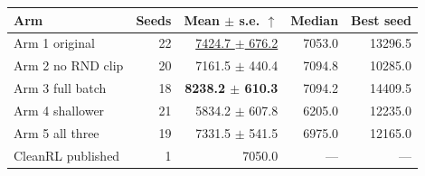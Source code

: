 \begin{tabular}{@{}lrrrr@{}}
\toprule
\textbf{Arm} & \textbf{Seeds} & \textbf{Mean $\pm$ s.e.} $\uparrow$ & \textbf{Median} & \textbf{Best seed} \\
\midrule
Arm 1 original & 22 & \underline{7424.7 $\pm$ 676.2} & 7053.0 & 13296.5 \\
Arm 2 no RND clip & 20 & 7161.5 $\pm$ 440.4 & 7094.8 & 10285.0 \\
Arm 3 full batch & 18 & \textbf{8238.2 $\pm$ 610.3} & 7094.2 & 14409.5 \\
Arm 4 shallower & 21 & 5834.2 $\pm$ 607.8 & 6205.0 & 12235.0 \\
Arm 5 all three & 19 & 7331.5 $\pm$ 541.5 & 6975.0 & 12165.0 \\
\midrule
CleanRL published & 1 & 7050.0 & --- & --- \\
\bottomrule
\end{tabular}
